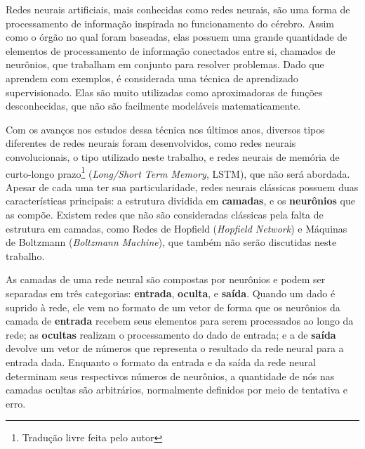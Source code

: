 
Redes neurais artificiais, mais conhecidas como redes neurais, são uma forma de processamento de informação inspirada no funcionamento do cérebro.
Assim como o órgão no qual foram baseadas, elas possuem uma grande quantidade de elementos de processamento de informação conectados entre si, chamados de neurônios, que trabalham em conjunto para resolver problemas.
Dado que aprendem com exemplos, é considerada uma técnica de aprendizado supervisionado.
Elas são muito utilizadas como aproximadoras de funções desconhecidas, que não são facilmente modeláveis matematicamente.

Com os avanços nos estudos dessa técnica nos últimos anos, diversos tipos diferentes de redes neurais foram desenvolvidos, como redes neurais convolucionais, o tipo utilizado neste trabalho, e redes neurais de memória de curto-longo prazo\footnote{Tradução livre feita pelo autor} (\textit{Long/Short Term Memory}, LSTM), que não será abordada.
Apesar de cada uma ter sua particularidade, redes neurais clássicas possuem duas características principais: a estrutura dividida em \textbf{camadas}, e os \textbf{neurônios} que as compõe.
Existem redes que não são consideradas clássicas pela falta de estrutura em camadas, como Redes de Hopfield (\textit{Hopfield Network}) e Máquinas de Boltzmann (\textit{Boltzmann Machine}), que também não serão discutidas neste trabalho.

As camadas de uma rede neural são compostas por neurônios e podem ser separadas em três categorias: \textbf{entrada}, \textbf{oculta}, e \textbf{saída}.
Quando um dado é suprido à rede, ele vem no formato de um vetor de forma que os neurônios da camada de \textbf{entrada} recebem seus elementos para serem processados ao longo da rede;
as \textbf{ocultas} realizam o processamento do dado de entrada;
e a de \textbf{saída} devolve um vetor de números que representa o resultado da rede neural para a entrada dada.
Enquanto o formato da entrada e da saída da rede neural determinam seus respectivos números de neurônios, a quantidade de nós nas camadas ocultas são arbitrários, normalmente definidos por meio de tentativa e erro.

